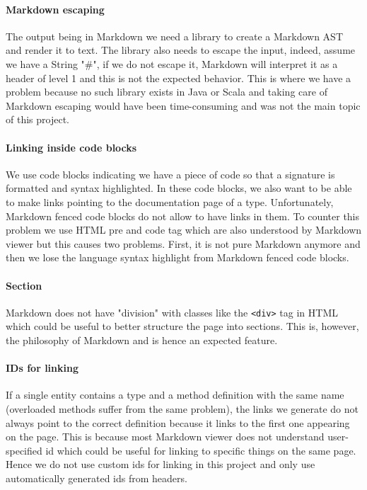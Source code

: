 \documentclass{report}
\begin{document}
\paragraph{Markdown escaping}
The output being in Markdown we need a library to create a Markdown AST and render it to text. The library also needs to escape the input, indeed, assume we have a String "\#", if we do not escape it, Markdown will interpret it as a header of level 1 and this is not the expected behavior. This is where we have a problem because no such library exists in Java or Scala and taking care of Markdown escaping would have been time-consuming and was not the main topic of this project.

\paragraph{Linking inside code blocks}
We use code blocks indicating we have a piece of code so that a signature is formatted and syntax highlighted. In these code blocks, we also want to be able to make links pointing to the documentation page of a type. Unfortunately, Markdown fenced code blocks do not allow to have links in them. To counter this problem we use HTML pre and code tag which are also understood by Markdown viewer but this causes two problems. First, it is not pure Markdown anymore and then we lose the language syntax highlight from Markdown fenced code blocks.

\paragraph{Section}
Markdown does not have "division" with classes like the \texttt{<div>} tag in HTML which could be useful to better structure the page into sections. This is, however, the philosophy of Markdown and is hence an expected feature.

\paragraph{IDs for linking}
If a single entity contains a type and a method definition with the same name (overloaded methods suffer from the same problem), the links we generate do not always point to the correct definition because it links to the first one appearing on the page. This is because most Markdown viewer does not understand user-specified id which could be useful for linking to specific things on the same page. Hence we do not use custom ids for linking in this project and only use automatically generated ids from headers.
\end{document}
